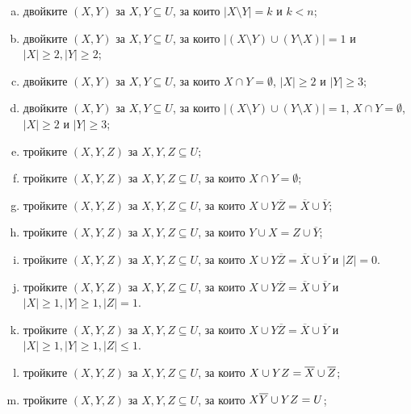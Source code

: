 \begin{problem}
\begin{enumerate}[a)]
  \item
    двойките $(X,Y)$ за $X,Y\subseteq U$, за които $\vert{X\setminus Y}\vert = k$ и $k < n$;
  \item
    двойките $(X,Y)$ за $X,Y\subseteq U$, за които $|(X\setminus Y)\cup(Y\setminus X)| = 1$ и 
    $|X|\geq 2, |Y|\geq 2$;
  \item
    двойките $(X,Y)$ за $X,Y\subseteq U$, за които $X\cap Y = \emptyset$, $|X|\geq 2$ и $|Y|\geq 3$;
  \item
    двойките $(X,Y)$ за $X,Y\subseteq U$, за които $|(X\setminus Y)\cup(Y\setminus X)| = 1$, $X\cap Y = \emptyset$, $|X|\geq 2$ и $|Y|\geq 3$;
  \item
    тройките $(X,Y,Z)$ за $X,Y,Z\subseteq U$;
  \item
    тройките $(X,Y,Z)$ за $X,Y,Z\subseteq U$, за които $X \cap Y = \emptyset$;
  \item
    тройките $(X,Y,Z)$ за $X,Y,Z\subseteq U$, за които $X\cup Y\overline{Z} = \overline{X}\cup\overline{Y}$;
  \item
    тройките $(X,Y,Z)$ за $X,Y,Z\subseteq U$, за които $Y\cup X = Z\cup\overline{Y}$;
  \item
    тройките $(X,Y,Z)$ за $X,Y,Z\subseteq U$, за които $X\cup Y\overline{Z} = \overline{X}\cup\overline{Y}$ и
    $|Z| = 0$.
  \item
    тройките $(X,Y,Z)$ за $X,Y,Z\subseteq U$, за които $X\cup Y\overline{Z} = \overline{X}\cup\overline{Y}$ и
    $|X|\geq 1, |Y|\geq 1, |Z| = 1$.
  \item
    тройките $(X,Y,Z)$ за $X,Y,Z\subseteq U$, за които $X\cup Y\overline{Z} = \overline{X}\cup\overline{Y}$ и
    $|X|\geq 1, |Y|\geq 1, |Z|\leq 1$.
  \item
    тройките $(X,Y,Z)$ за $X,Y,Z\subseteq U$, за които $X \cup YZ = \overline{X} \cup \overline{Z}$;
  \item
    тройките $(X,Y,Z)$ за $X,Y,Z\subseteq U$, за които $X\overline{Y} \cup YZ = U$;
  \end{enumerate}
\end{problem}
